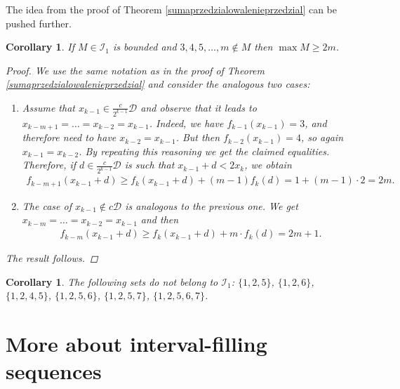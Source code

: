 \documentclass{amsart}
\newtheorem{corollary}[theorem]{Corollary}
\theoremstyle{definition}
\begin{document}
The idea from the proof of Theorem \ref{sumaprzedzialowalenieprzedzial} can be pushed further.

\begin{corollary}\label{niematrojkitojestszostka}%
If $M\in \mathcal{I}_1$ is bounded and $3,4,5,\ldots,m\notin M$ then $\max M\geq 2m$.   %
\begin{proof}
We use the same notation as in the proof of Theorem \ref{sumaprzedzialowalenieprzedzial} and consider the analogous two cases:
\begin{enumerate}
	\item Assume that $x_{k-1}\in \frac{c}{2^{k-1}}\mathcal{D}$ and observe that it leads to $x_{k-m+1}=\ldots=x_{k-2}=x_{k-1}$. Indeed, we have $f_{k-1}(x_{k-1})=3$, and therefore need to have $x_{k-2}=x_{k-1}$. But then $f_{k-2}(x_{k-1})=4$, so again $x_{k-1}=x_{k-2}$. By repeating this reasoning we get the claimed equalities. Therefore, if $d \in\frac{c}{2^{k-1}}\mathcal{D}$ is such that $x_{k-1}+d<2x_{k}$, we obtain
	\begin{align*}
		f_{k-m+1}(x_{k-1}+d)\geq f_k(x_{k-1}+d) + (m-1)f_k(d)= 1 +(m-1)\cdot 2=2m.
	\end{align*}
	\item The case of $x_{k-1}\notin c\mathcal{D}$ is analogous to the previous one. We get $x_{k-m}=\ldots=x_{k-2}=x_{k-1}$ and then
	\begin{align*}
	f_{k-m}(x_{k-1}+d)\geq  f_{k}(x_{k-1}+d) + m\cdot f_k(d)=2m+1.
	\end{align*}
\end{enumerate}
The result follows.
\end{proof}
\end{corollary}


\begin{corollary}
The following sets do not belong to $\mathcal{I}_{1}$:
$\{1,2,5\}$, $\{1,2,6\}$, $\{1,2,4,5\}$, $\{1,2,5,6\}$, $\{1,2,5,7\}$, $\{1,2,5,6,7\}$.
\end{corollary}


\section{More about interval-filling sequences}
\end{document}

